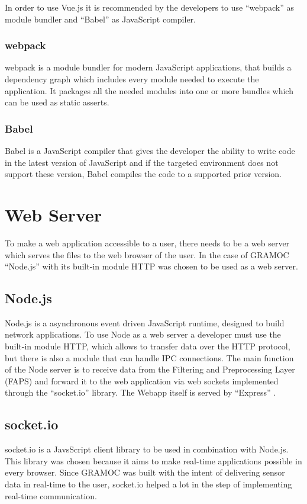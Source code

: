 In order to use Vue.js it is recommended by the developers to use ``webpack'' \cite{webpack} as module bundler and ``Babel'' \cite{Babel} as JavaScript compiler.

\subsubsection{webpack}
webpack is a module bundler for modern JavaScript applications, that builds a dependency graph which includes every module needed to execute the application. It packages all the needed modules into one or more bundles which can be used as static asserts.

\subsubsection{Babel}
Babel is a JavaScript compiler that gives the developer the ability to write code in the latest version of JavaScript and if the targeted environment does not support these version, Babel compiles the code to a supported prior version.

\section{Web Server}
To make a web application accessible to a user, there needs to be a web server which serves the files to the web browser of the user. In the case of GRAMOC ``Node.js'' \cite{Node} with its built-in module HTTP was chosen to be used as a web server.

\subsection{Node.js}
Node.js \cite{Node} is a asynchronous event driven JavaScript runtime, designed to build network applications. To use Node as a web server a developer must use the built-in module HTTP, which allows to transfer data over the HTTP protocol, but there is also a module that can handle IPC connections. The main function of the Node server is to receive data from the Filtering and Preprocessing Layer (FAPS) and forward it to the web application via web sockets implemented through the ``socket.io'' \cite{socketio} library. The Webapp itself is served by ``Express'' \cite{express}.

\subsection{socket.io}
socket.io is a JavsScript client library to be used in combination with Node.js. This library was chosen because it aims to make real-time applications possible in every browser. Since GRAMOC was built with the intent of delivering sensor data in real-time to the user, socket.io helped a lot in the step of implementing real-time communication.

